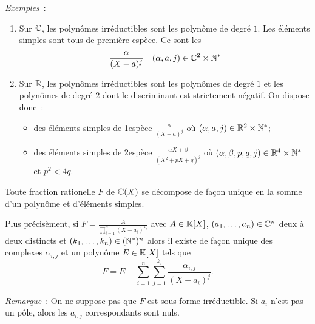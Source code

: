 \emph{Exemples}~:
\begin{enumerate}
\item Sur $\mathbb{C}$, les polynômes irréductibles sont les polynôme de degré $1$. Les éléments simples sont tous de première espèce. Ce sont les
  \begin{equation}
    \frac{\alpha}{(X-a)^j} \quad (\alpha,a,j)\in \mathbb{C}^2\times \mathbb{N}^*
  \end{equation}
\item Sur $\mathbb{R}$, les polynômes irréductibles sont les polynômes de degré $1$ et les polynômes de degré $2$ dont le discriminant est strictement négatif. On dispose donc~:
  \begin{itemize}
  \item des éléments simples de 1\iere espèce $\frac{\alpha}{(X-a)^j}$ où $(\alpha,a,j)\in \mathbb{R}^2\times \mathbb{N}^*$;
  \item des éléments simples de 2\ieme espèce $\frac{\alpha X+\beta}{(X^2+pX+q)^j}$ où $(\alpha,\beta,p,q,j)\in \mathbb{R}^4\times \mathbb{N}^*$ et $p^2<4q$.
  \end{itemize}
\end{enumerate}

\begin{theo}
  Toute fraction rationelle $F$ de $\mathbb{C}(X)$ se décompose de façon unique en la somme d'un polynôme et d'éléments simples.

  Plus précisèment, si $F=\frac{A}{\prod_{i=1}^n(X-a_i)^{k_i}}$ avec $A\in\mathbb{K}[X]$, $(a_1,\ldots,a_n) \in \mathbb{C}^n$ deux à deux distincts et $(k_1,\ldots,k_n)\in (\mathbb{N}^*)^n$ alors il existe de façon unique des complexes $\alpha_{i,j}$ et un polynôme $E\in\mathbb{K}[X]$ tels que
  \begin{equation}
    F=E+\sum_{i=1}^n\sum_{j=1}^{k_i} \frac{\alpha_{i,j}}{(X-a_i)^{j}}.
  \end{equation}
\end{theo}

\emph{Remarque}~: On ne suppose pas que $F$ est sous forme irréductible. Si $a_i$ n'est pas un pôle, alors les $a_{i,j}$ correspondants sont nuls.

